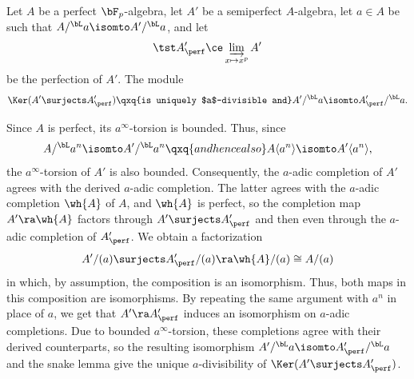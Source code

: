 

\blem \label{lem:auxiliary-perfect-semiperfect-control}
Let $A$ be a perfect $\bF_p$-algebra, let $A'$ be a semiperfect $A$-algebra, let $a \in A$ be such that $A/^\bL a\isomto A'/^\bL a$, and let
\[
\tst A'_\perf \ce \varinjlim_{x \mapsto x^p} A'
\]
be the perfection of $A'$.   %
The module
\[
\Ker(A' \surjects A'_\perf) \qxq{is uniquely $a$-divisible and} A'/^\bL a\isomto A'_\perf/^\bL a.
\]
\elem

\bpf
Since $A$ is perfect, its $a^\infty$-torsion is bounded. Thus, since
\[
A/^\bL a^n \isomto A'/^\bL a^n \qxq{and hence also} A\langle a^n\rangle \isomto A'\langle a^n\rangle,
\] %
the $a^\infty$-torsion of $A'$ is also bounded. Consequently, the $a$-adic completion of $A'$ agrees with the derived $a$-adic completion. The latter agrees with the $a$-adic completion $\wh{A}$ of $A$, and $\wh{A}$ is perfect, so the completion map $A' \ra \wh{A}$ factors through $A' \surjects A'_\perf$ and then even through the $a$-adic completion of $A'_\perf$. We obtain a factorization
\[
A'/(a) \surjects A'_\perf/(a) \ra \wh{A}/(a) \cong A/(a)
\]%
in which, by assumption, the composition is an isomorphism. Thus, both maps in this composition are isomorphisms. By repeating the same argument with $a^n$ in place of $a$, we get that $A' \ra A'_\perf$ induces an isomorphism on $a$-adic completions. Due to bounded $a^\infty$-torsion, these completions agree with their derived counterparts, so the resulting isomorphism $A'/^\bL a\isomto A'_\perf/^\bL a$ and the snake lemma give the unique $a$-divisibility of  $\Ker(A' \surjects A'_\perf)$.
\epf





